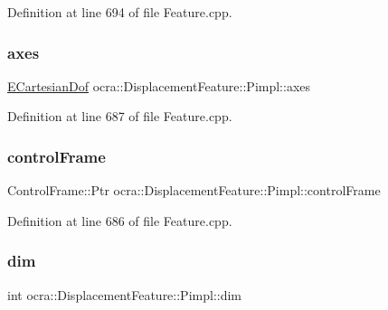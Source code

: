 Definition at line 694 of file Feature.\+cpp.

\hypertarget{structocra_1_1DisplacementFeature_1_1Pimpl_a8c3adba9fb891dac9c158ceb4fad62ea}{}\label{structocra_1_1DisplacementFeature_1_1Pimpl_a8c3adba9fb891dac9c158ceb4fad62ea} 
\subsubsection{\texorpdfstring{axes}{axes}}
{\footnotesize\ttfamily \hyperlink{namespaceocra_a436781c7059a0f76027df1c652126260}{E\+Cartesian\+Dof} ocra\+::\+Displacement\+Feature\+::\+Pimpl\+::axes}



Definition at line 687 of file Feature.\+cpp.

\hypertarget{structocra_1_1DisplacementFeature_1_1Pimpl_a7bf1e93fdc7fe08d51a844161f565223}{}\label{structocra_1_1DisplacementFeature_1_1Pimpl_a7bf1e93fdc7fe08d51a844161f565223} 
\subsubsection{\texorpdfstring{control\+Frame}{controlFrame}}
{\footnotesize\ttfamily Control\+Frame\+::\+Ptr ocra\+::\+Displacement\+Feature\+::\+Pimpl\+::control\+Frame}



Definition at line 686 of file Feature.\+cpp.

\hypertarget{structocra_1_1DisplacementFeature_1_1Pimpl_a1d9edf50ee4d19d01b71ae2e871519b6}{}\label{structocra_1_1DisplacementFeature_1_1Pimpl_a1d9edf50ee4d19d01b71ae2e871519b6} 
\subsubsection{\texorpdfstring{dim}{dim}}
{\footnotesize\ttfamily int ocra\+::\+Displacement\+Feature\+::\+Pimpl\+::dim}



